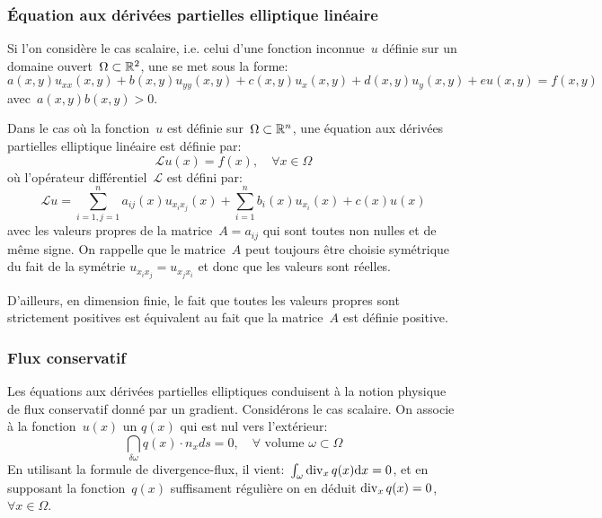 \medskip
\subsubsection{Équation aux dérivées partielles elliptique linéaire}
Si l'on considère le cas scalaire, i.e. celui d'une fonction inconnue~$u$ définie sur un domaine 
ouvert~$\Omega\subset\mathbb R^2$, une  se met sous la forme:
\begin{equation}a(x, y)u_{xx}(x, y) + b(x, y)u_{yy}(x, y) + c(x, y)u_x(x, y) + d(x, y)u_y(x, y) + eu(x, y) = f(x, y)\end{equation}
avec~$a(x, y)b(x, y) > 0$.

Dans le cas où la fonction~$u$ est définie sur~$\Omega\subset\mathbb R^n$, une équation aux dérivées partielles elliptique 
linéaire est définie par:
\begin{equation} \mathcal{L}u(x) = f(x),\quad \forall x\in\Omega \end{equation}
où l'opérateur différentiel~$\mathcal{L}$ est défini par:
\begin{equation}
\mathcal{L}u = \sum_{i=1, j=1}^n a_{ij}(x)u_{x_ix_j} (x) +
\sum_{i=1}^n b_i(x)u_{x_i}(x) + c(x)u(x)
\end{equation}
avec les valeurs propres de la matrice~$A = a_{ij}$ qui sont toutes non nulles et de même signe. 
On rappelle que le matrice~$A$ peut toujours être choisie symétrique du fait de la symétrie 
$u_{x_ix_j} = u_{x_jx_i}$ et donc que les valeurs sont réelles.

D'ailleurs, en dimension finie, le fait que toutes les valeurs propres sont strictement positives
est équivalent au fait que la matrice~$A$ est définie positive.

\medskip
\subsubsection{Flux conservatif}
Les équations aux dérivées partielles elliptiques conduisent à la notion physique de flux conservatif donné
par un gradient. Considérons le cas scalaire. On associe à la fonction~$u(x)$ un 
$q(x)$ qui est nul vers l'extérieur:
\begin{equation}\dint_{\delta\omega} q(x)\cdot n_x ds=0,\quad\forall\text{ volume }\omega\subset\Omega\end{equation}
En utilisant la formule de divergence-flux, il vient:~$\int_\omega \operatorname{div}_xq(x)\mathrm dx=0$, et
en supposant la fonction~$q(x)$ suffisament régulière on en déduit
$\operatorname{div}_xq(x)=0$, $\forall x\in\Omega$.

